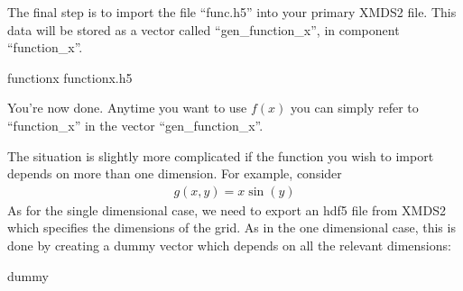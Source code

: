 \documentclass[letterpaper,10pt,english]{sphinxmanual}
\begin{document}
\sphinxAtStartPar
The final step is to import the file “func.h5” into your primary XMDS2 file. This data will be stored as a vector called “gen\_function\_x”, in component “function\_x”.

\begin{sphinxVerbatim}[commandchars=\\\{\}]
   
  function\PYGZus{}x
   
     function\PYGZus{}x.h5 
\end{sphinxVerbatim}

\sphinxAtStartPar
You’re now done. Anytime you want to use \(f(x)\) you can simply refer to “function\_x” in the vector “gen\_function\_x”.

\sphinxAtStartPar
The situation is slightly more complicated if the function you wish to import depends on more than one dimension. For example, consider
\begin{equation*}
\begin{split}g(x,y) = x \sin(y)\end{split}
\end{equation*}
\sphinxAtStartPar
As for the single dimensional case, we need to export an hdf5 file from XMDS2 which specifies the dimensions of the grid. As in the one dimensional case, this is done by creating a dummy vector which depends on all the relevant dimensions:

\begin{sphinxVerbatim}[commandchars=\\\{\}]
   
  dummy
  \PYG{c+cp}{\PYGZlt{}![CDATA[}
      
      \PYG{c+cp}{]]\PYGZgt{}}
\end{sphinxVerbatim}
\end{document}
